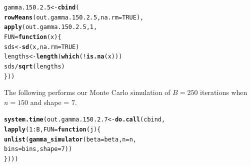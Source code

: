 \documentclass[11pt]{article}\usepackage[]{graphicx}\usepackage[]{color}
\makeatletter
\newcommand{\hlnum}[1]{\textcolor[rgb]{0.686,0.059,0.569}{#1}}%
\newcommand{\hlopt}[1]{\textcolor[rgb]{0,0,0}{#1}}%
\newcommand{\hlstd}[1]{\textcolor[rgb]{0.345,0.345,0.345}{#1}}%
\newcommand{\hlkwa}[1]{\textcolor[rgb]{0.161,0.373,0.58}{\textbf{#1}}}%
\newcommand{\hlkwb}[1]{\textcolor[rgb]{0.69,0.353,0.396}{#1}}%
\newcommand{\hlkwc}[1]{\textcolor[rgb]{0.333,0.667,0.333}{#1}}%
\newcommand{\hlkwd}[1]{\textcolor[rgb]{0.737,0.353,0.396}{\textbf{#1}}}%
\newenvironment{kframe}{%
 \def\at@end@of@kframe{}%
 \ifinner\ifhmode%
  \def\at@end@of@kframe{\end{minipage}}%
  \begin{minipage}{\columnwidth}%
 \fi\fi%
 \def\FrameCommand##1{\hskip\@totalleftmargin \hskip-\fboxsep
 \colorbox{shadecolor}{##1}\hskip-\fboxsep
     \hskip-\linewidth \hskip-\@totalleftmargin \hskip\columnwidth}%
 \MakeFramed {\advance\hsize-\width
   \@totalleftmargin\z@ \linewidth\hsize
   \@setminipage}}%
 {\par\unskip\endMakeFramed%
 \at@end@of@kframe}
\newenvironment{knitrout}{}{} %
\makeatother
\begin{document}
\begin{knitrout}
\color{fgcolor}\begin{kframe}
\begin{alltt}
\hlstd{gamma.150.2.5} \hlkwb{<-} \hlkwd{cbind}\hlstd{(}
  \hlkwd{rowMeans}\hlstd{(out.gamma.150.2.5,} \hlkwc{na.rm} \hlstd{=} \hlnum{TRUE}\hlstd{),}
  \hlkwd{apply}\hlstd{(out.gamma.150.2.5,} \hlnum{1}\hlstd{,}
  \hlkwc{FUN} \hlstd{=} \hlkwa{function}\hlstd{(}\hlkwc{x}\hlstd{)\{}
    \hlstd{sds} \hlkwb{<-} \hlkwd{sd}\hlstd{(x,} \hlkwc{na.rm} \hlstd{=} \hlnum{TRUE}\hlstd{)}
    \hlstd{lengths} \hlkwb{<-} \hlkwd{length}\hlstd{(}\hlkwd{which}\hlstd{(}\hlopt{!}\hlkwd{is.na}\hlstd{(x)))}
    \hlstd{sds} \hlopt{/} \hlkwd{sqrt}\hlstd{(lengths)}
  \hlstd{\}))}
\end{alltt}


{\ttfamily\noindent\bfseries\color{errorcolor}{\#\# Error in is.data.frame(x): object 'out.gamma.150.2.5' not found}}\end{kframe}
\end{knitrout}

The following performs our Monte Carlo simulation of $B = 250$ iterations 
when $n = 150$ and shape = $7$.

\begin{knitrout}
\color{fgcolor}\begin{kframe}
\begin{alltt}
\hlkwd{system.time}\hlstd{(out.gamma.150.2.7} \hlkwb{<-} \hlkwd{do.call}\hlstd{(cbind,}
  \hlkwd{lapply}\hlstd{(}\hlnum{1}\hlopt{:}\hlstd{B,} \hlkwc{FUN} \hlstd{=} \hlkwa{function}\hlstd{(}\hlkwc{j}\hlstd{)\{}
    \hlkwd{unlist}\hlstd{(}\hlkwd{gamma_simulator}\hlstd{(}\hlkwc{beta} \hlstd{= beta,} \hlkwc{n} \hlstd{= n,}
      \hlkwc{bins} \hlstd{= bins,} \hlkwc{shape} \hlstd{=} \hlnum{7}\hlstd{))}
\hlstd{\})))}
\end{alltt}


{\ttfamily\noindent\bfseries\color{errorcolor}{\#\# Error in eval(predvars, data, env): object 'x1' not found}}

{\ttfamily\noindent\itshape\color{messagecolor}{\#\# Timing stopped at: 0.002 0 0.002}}\end{kframe}
\end{knitrout}
\end{document}
